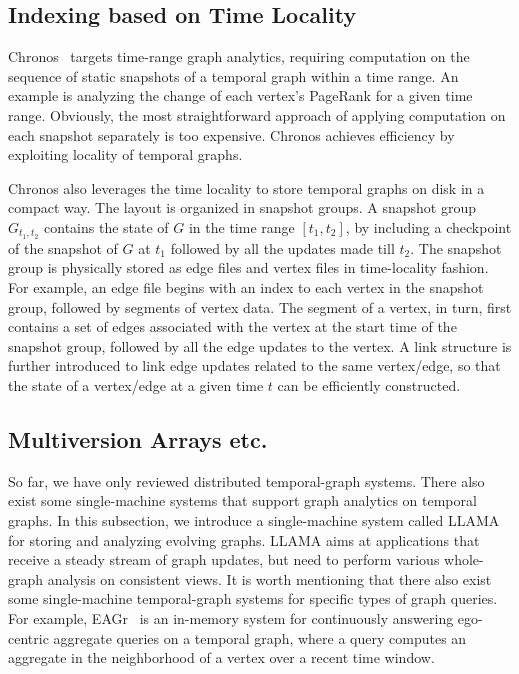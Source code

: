 \documentclass{svjour3}
\begin{document}
\subsection{Indexing based on Time Locality}
Chronos~\cite{han2014chronos} targets time-range graph analytics, requiring computation on the sequence of static snapshots of a temporal graph within a time range. An example is analyzing the change of each vertex's PageRank for a given time range. Obviously, the most straightforward approach of applying computation on each snapshot separately is too expensive. Chronos achieves efficiency by exploiting locality of temporal graphs.

\vspace{2mm}


 Chronos also leverages the time locality to store temporal graphs on disk in a compact way. The layout is organized in snapshot groups. A snapshot group $G_{t_1,t_2}$ contains the state of $G$ in the time range $[t_1,t_2]$, by including a checkpoint of the snapshot of $G$ at $t_1$ followed by all the updates made till $t_2$. The snapshot group is physically stored as edge files and vertex files in time-locality fashion. For example, an edge file begins with an index to each vertex in the snapshot group, followed by segments of vertex data. The segment of a vertex, in turn, first contains a set of edges associated with the vertex at the start time of the snapshot group, followed by all the edge updates to the vertex. A link structure is further introduced to link edge updates related to the same vertex/edge, so that the state of a vertex/edge at a given time $t$ can be efficiently constructed.

\subsection{Multiversion Arrays etc.}
So far, we have only reviewed distributed temporal-graph systems. There also exist some single-machine systems that support graph analytics on temporal graphs. In this subsection, we introduce a single-machine system called LLAMA~\cite{macko2015llama} for storing and analyzing evolving graphs. LLAMA aims at applications that receive a steady stream of graph updates, but need to perform various whole-graph analysis on consistent views. It is worth mentioning that there also exist some single-machine temporal-graph systems for specific types of graph queries. For example, EAGr~\cite{eagr} is an in-memory system for continuously answering ego-centric aggregate queries on a temporal graph, where a query computes an aggregate in the neighborhood of a vertex over a recent time window.
\end{document}
